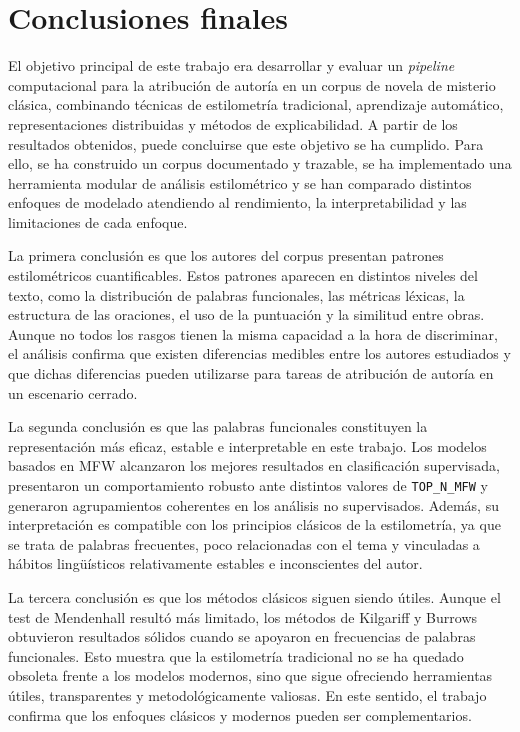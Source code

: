 \documentclass[IB]{TFUOC}%
\begin{document}
\section{Conclusiones finales}

El objetivo principal de este trabajo era desarrollar y evaluar un \textit{pipeline} computacional para la atribución de autoría en un corpus de novela de misterio clásica, combinando técnicas de estilometría tradicional, aprendizaje automático, representaciones distribuidas y métodos de explicabilidad. A partir de los resultados obtenidos, puede concluirse que este objetivo se ha cumplido. Para ello, se ha construido un corpus documentado y trazable, se ha implementado una herramienta modular de análisis estilométrico y se han comparado distintos enfoques de modelado atendiendo al rendimiento, la interpretabilidad y las limitaciones de cada enfoque.

La primera conclusión es que los autores del corpus presentan patrones estilométricos cuantificables. Estos patrones aparecen en distintos niveles del texto, como la distribución de palabras funcionales, las métricas léxicas, la estructura de las oraciones, el uso de la puntuación y la similitud entre obras. Aunque no todos los rasgos tienen la misma capacidad a la hora de discriminar, el análisis confirma que existen diferencias medibles entre los autores estudiados y que dichas diferencias pueden utilizarse para tareas de atribución de autoría en un escenario cerrado.

La segunda conclusión es que las palabras funcionales constituyen la representación más eficaz, estable e interpretable en este trabajo. Los modelos basados en MFW alcanzaron los mejores resultados en clasificación supervisada, presentaron un comportamiento robusto ante distintos valores de \texttt{TOP\_N\_MFW} y generaron agrupamientos coherentes en los análisis no supervisados. Además, su interpretación es compatible con los principios clásicos de la estilometría, ya que se trata de palabras frecuentes, poco relacionadas con el tema y vinculadas a hábitos lingüísticos relativamente estables e inconscientes del autor.

La tercera conclusión es que los métodos clásicos siguen siendo útiles. Aunque el test de Mendenhall resultó más limitado, los métodos de Kilgariff y Burrows obtuvieron resultados sólidos cuando se apoyaron en frecuencias de palabras funcionales. Esto muestra que la estilometría tradicional no se ha quedado obsoleta frente a los modelos modernos, sino que sigue ofreciendo herramientas útiles, transparentes y metodológicamente valiosas. En este sentido, el trabajo confirma que los enfoques clásicos y modernos pueden ser complementarios.
\end{document}
